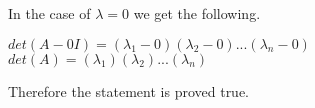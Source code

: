 	\newline
	In the case of $\lambda=0$ we get the following.
	\begin{center}
	    $det(A-0I)=(\lambda_1-0)(\lambda_2-0)...(\lambda_n-0)$
	    \newline
	    $det(A)=(\lambda_1)(\lambda_2)...(\lambda_n)$
	    \newline
	\end{center}
	Therefore the statement is proved true.
